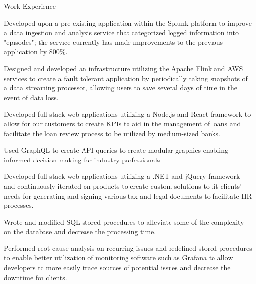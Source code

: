 \documentclass{resume} %
\begin{document}
\begin{workSection}{Work Experience}
    \experienceItem[
        company=Splunk,
        location=San Jose{,} CA,
        position=Backend Software Engineer Intern,
        duration=May 2023 – July 2023
    ]
     \begin{bullets}
        \item Developed upon a pre-existing application within the Splunk platform to improve a data ingestion and analysis service that categorized logged information into "episodes"; the service currently has made improvements to the previous application by 800\%.
        \item Designed and developed an infrastructure utilizing the Apache Flink and AWS services to create a fault tolerant application by periodically taking snapshots of a data streaming processor, allowing users to save several days of time in the event of data loss.
     \end{bullets}
     
    \experienceItem[
        company=QwickRate,
        location=Marietta{,} GA (Remote),
        position=Software Engineer Intern,
        duration=August 2022 – April 2023
    ]
    \begin{bullets}
        \item Developed full-stack web applications utilizing a Node.js and React framework to allow for our customers to create KPIs to aid in the management of loans and facilitate the loan review process to be utilized by medium-sized banks.
        \item Used GraphQL to create API queries to create modular graphics enabling informed decision-making for industry professionals.
     \end{bullets}

     \experienceItem[
        company=Ultimate Kronos Group (UKG),
        location=Atlanta{,} GA,
        position=Full-stack Software Engineer Intern,
        duration=January 2022 - August 2022,
     ]
     \begin{bullets}
        \item Developed full-stack web applications utilizing a .NET and jQuery framework and continuously iterated on products to create custom solutions to fit clients’ needs for generating and signing various tax and legal documents to facilitate HR processes.
        \item Wrote and modified SQL stored procedures to alleviate some of the complexity on the database and decrease the processing time.
        \item Performed root-cause analysis on recurring issues and redefined stored procedures to enable better utilization of monitoring software such as Grafana to allow developers to more easily trace sources of potential issues and decrease the downtime for clients.
     \end{bullets}
     
\end{workSection}
\end{document}
